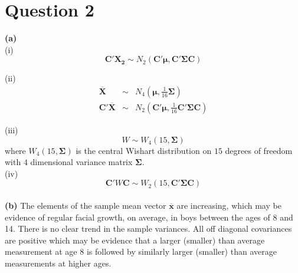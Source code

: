 \documentclass[a4paper,11pt]{article}
\begin{document}
\clearpage
\section{Question 2}

{\bf (a)}\\
(i)
\begin{equation}
\mathbf{C'X_2} \sim N_2(\mathbf{C'}\bm{\mu},\mathbf{C'\Sigma C})
\end{equation}

(ii)
\begin{eqnarray}
\mathbf{\overline{X}}    & \sim & N_4(\bm{\mu},\tfrac{1}{16}\mathbf{\Sigma})\nonumber  \\
\mathbf{C'\overline{X}}  & \sim & N_2(\mathbf{C'}\bm{\mu},\tfrac{1}{16}\mathbf{C'\Sigma C})
\end{eqnarray}

(iii)
\begin{equation}
W \sim W_4(15,\mathbf{\Sigma})
\end{equation}
where $W_4(15,\mathbf{\Sigma})$ is the central Wishart distribution on $15$ degrees of freedom with $4$ dimensional variance matrix $\mathbf{\Sigma}$.\\

(iv)
\begin{equation}
\mathbf{C'}W\mathbf{C} \sim W_2(15,\mathbf{C'\Sigma C})
\end{equation}\\

{\bf (b)} The elements of the sample mean vector $\mathbf\overline{x}$ are increasing, which may be evidence of regular facial growth, on average, in boys between the ages of 8 and 14. There is no clear trend in the sample variances. All off diagonal covariances are positive which may be evidence that a larger (smaller) than average measurement at age 8 is followed by similarly larger (smaller) than average measurements at higher ages.\\
\end{document}

